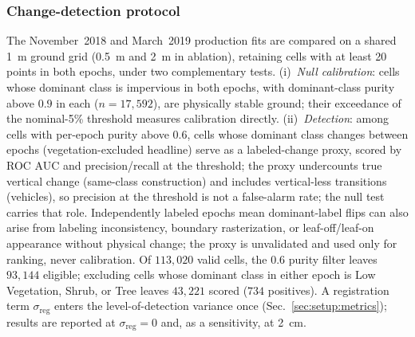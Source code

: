 \subsubsection{Change-detection protocol}
 The November~2018 and March~2019 production fits are compared on a
shared 1~m ground grid (0.5~m and 2~m in ablation), retaining cells with
at least 20 points in both epochs, under two complementary tests.
(i)~\emph{Null calibration}: cells whose dominant class is impervious in
both epochs, with dominant-class purity above $0.9$ in each
($n=17{,}592$), are physically stable ground; their
exceedance of the nominal-5\% threshold measures calibration
directly. (ii)~\emph{Detection}: among cells with per-epoch purity
above $0.6$, cells whose dominant class changes
between epochs (vegetation-excluded headline) serve as a labeled-change
proxy, scored by ROC AUC and precision/recall at the threshold; the
proxy undercounts true vertical change (same-class construction) and
includes vertical-less transitions (vehicles), so precision at the
threshold is not a false-alarm rate; the null test carries that role.
Independently labeled epochs mean dominant-label flips can
also arise from labeling inconsistency, boundary rasterization, or
leaf-off/leaf-on appearance without physical change; the proxy is
unvalidated and used only for ranking, never calibration.
Of $113{,}020$ valid cells, the $0.6$ purity filter leaves $93{,}144$
eligible; excluding cells whose dominant class in either epoch is Low
Vegetation, Shrub, or Tree leaves $43{,}221$ scored ($734$ positives).
A registration term $\sigma_{\mathrm{reg}}$ enters the level-of-detection
variance once (Sec.~\ref{sec:setup:metrics}); results are reported at
$\sigma_{\mathrm{reg}}=0$ and, as a sensitivity, at 2~cm.

